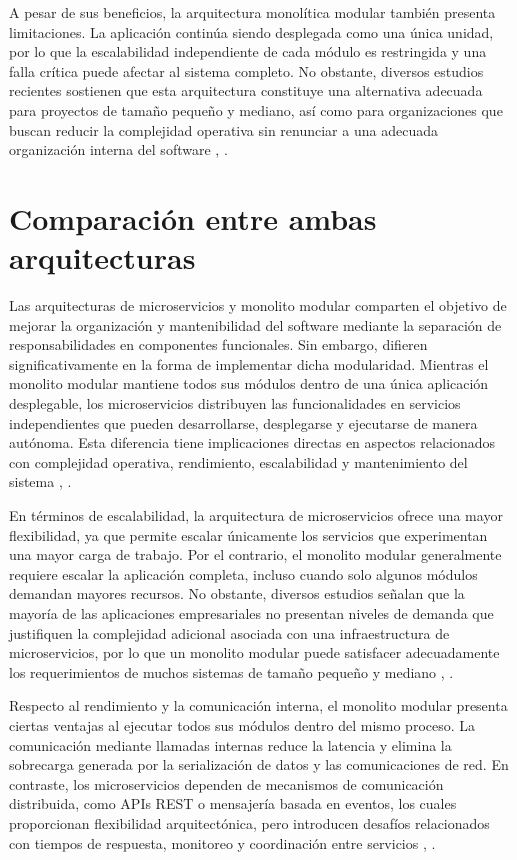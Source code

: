 \documentclass[10pt,conference]{IEEEtran}
\begin{document}
A pesar de sus beneficios, la arquitectura monolítica modular también presenta limitaciones. La aplicación continúa siendo desplegada como una única unidad, por lo que la escalabilidad independiente de cada módulo es restringida y una falla crítica puede afectar al sistema completo. No obstante, diversos estudios recientes sostienen que esta arquitectura constituye una alternativa adecuada para proyectos de tamaño pequeño y mediano, así como para organizaciones que buscan reducir la complejidad operativa sin renunciar a una adecuada organización interna del software \cite{ref20}, \cite{ref17}.

\section{Comparación entre ambas arquitecturas}
Las arquitecturas de microservicios y monolito modular comparten el objetivo de mejorar la organización y mantenibilidad del software mediante la separación de responsabilidades en componentes funcionales. Sin embargo, difieren significativamente en la forma de implementar dicha modularidad. Mientras el monolito modular mantiene todos sus módulos dentro de una única aplicación desplegable, los microservicios distribuyen las funcionalidades en servicios independientes que pueden desarrollarse, desplegarse y ejecutarse de manera autónoma. Esta diferencia tiene implicaciones directas en aspectos relacionados con complejidad operativa, rendimiento, escalabilidad y mantenimiento del sistema \cite{ref9}, \cite{ref18}.

En términos de escalabilidad, la arquitectura de microservicios ofrece una mayor flexibilidad, ya que permite escalar únicamente los servicios que experimentan una mayor carga de trabajo. Por el contrario, el monolito modular generalmente requiere escalar la aplicación completa, incluso cuando solo algunos módulos demandan mayores recursos. No obstante, diversos estudios señalan que la mayoría de las aplicaciones empresariales no presentan niveles de demanda que justifiquen la complejidad adicional asociada con una infraestructura de microservicios, por lo que un monolito modular puede satisfacer adecuadamente los requerimientos de muchos sistemas de tamaño pequeño y mediano \cite{ref20}, \cite{ref10}.

Respecto al rendimiento y la comunicación interna, el monolito modular presenta ciertas ventajas al ejecutar todos sus módulos dentro del mismo proceso. La comunicación mediante llamadas internas reduce la latencia y elimina la sobrecarga generada por la serialización de datos y las comunicaciones de red. En contraste, los microservicios dependen de mecanismos de comunicación distribuida, como APIs REST o mensajería basada en eventos, los cuales proporcionan flexibilidad arquitectónica, pero introducen desafíos relacionados con tiempos de respuesta, monitoreo y coordinación entre servicios \cite{ref13}, \cite{ref21}.
\end{document}
